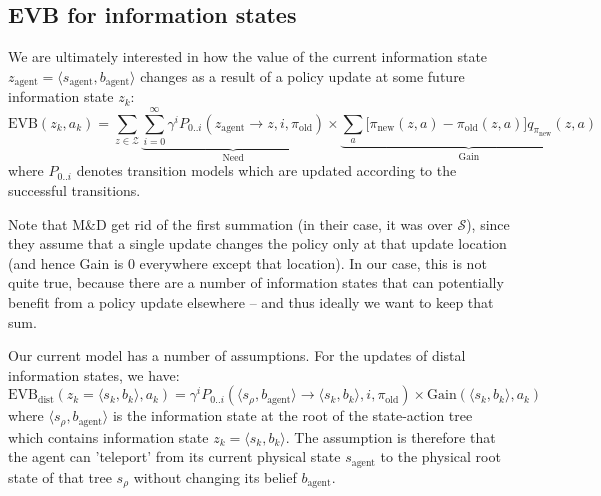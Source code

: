 \documentclass{article}
\newcommand{\old}{\text{old}}
\newcommand{\new}{\text{new}}
\begin{document}
\subsection*{EVB for information states}

We are ultimately interested in how the value of the current information state $z_{\text{agent}} = \langle s_{\text{agent}}, b_{\text{agent}} \rangle$ changes as a result of 
a policy update at some future information state $z_k$:
\begin{equation}
    \label{eqn:evb}
    \text{EVB}(z_k, a_k) = \sum_{z \in \mathcal{Z}} \underbrace{\sum_{i=0}^{\infty} \gamma^i P_{0..i}(z_{\text{agent}} \rightarrow z, i, \pi_{\old})}_{\text{Need}} \times \underbrace{\sum_a \big[ \pi_{\new}(z, a) - \pi_{\old}(z, a) \big] q_{\pi_{\new}}(z, a)}_{\text{Gain}}
\end{equation}
where $P_{0..i}$ denotes transition models which are updated according to the successful transitions. 

\bigbreak

Note that M\&D get rid of the first summation (in their case, it was over $\mathcal{S}$), since they assume that 
a single update changes the policy only at that update location (and hence Gain is $0$ everywhere except that location). 
In our case, this is not quite true, because there are a number of information states that can potentially benefit from a 
policy update elsewhere -- and thus ideally we want to keep that sum.

\bigbreak

Our current model has a number of assumptions. For the updates of distal information states, we have:
\begin{equation}
    \label{eqn:distal}
    \text{EVB}_{\text{dist}}(z_k=\langle s_k, b_k \rangle, a_k) = \gamma^i P_{0..i}(\langle s_\rho, b_{\text{agent}} \rangle \rightarrow \langle s_k, b_k \rangle, i, \pi_{\old}) \times \text{Gain}(\langle s_k, b_k \rangle, a_k)
\end{equation}
where $\langle s_\rho, b_{\text{agent}} \rangle$ is the information state at the root of the state-action tree which contains information state $z_k=\langle s_k, b_k \rangle$. The assumption is therefore 
that the agent can 'teleport' from its current physical state $s_\text{agent}$ to the physical root state of that tree $s_\rho$ without changing its belief $b_{\text{agent}}$.

\bigbreak
\end{document}
